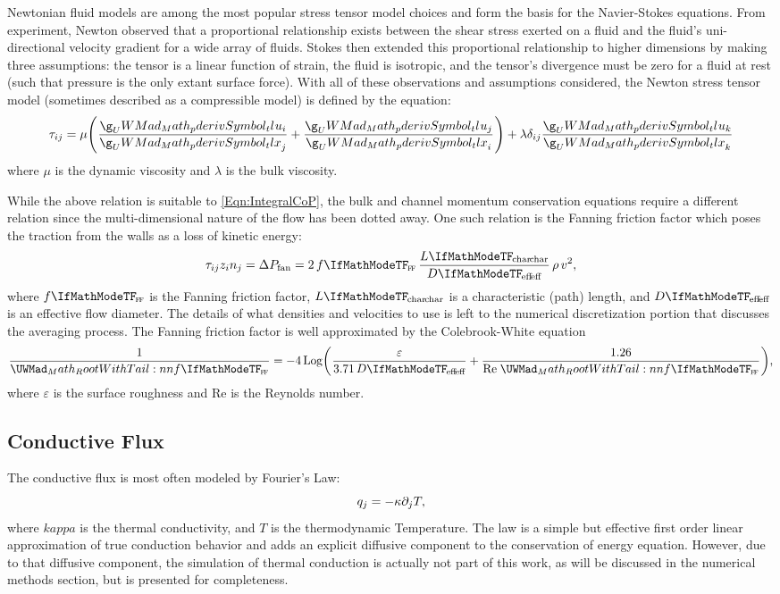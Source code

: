 \documentclass[12pt]{../UWMadThesis}
\begin{document}
Newtonian fluid models are among the most popular stress tensor model choices and form the basis for the Navier-Stokes equations.
From experiment, Newton observed that a proportional relationship exists between the shear stress exerted on a fluid and the fluid's uni-directional velocity gradient for a wide array of fluids.
Stokes then extended this proportional relationship to higher dimensions by making three assumptions: the tensor is a linear function of strain, the fluid is isotropic, and the tensor's divergence must be zero for a fluid at rest (such that pressure is the only extant surface force).
With all of these observations and assumptions considered, the Newton stress tensor model (sometimes described as a compressible model) is defined by the equation:
\begin{equation}
    \tau_{ij} = \mu \left(\pderiv{u_i}{x_j} + \pderiv{u_j}{x_i}\right) + \lambda \delta_{ij} \pderiv{u_k}{x_k}
\end{equation}
where $\mu$ is the dynamic viscosity and $\lambda$ is the bulk viscosity.

While the above relation is suitable to \cref{Eqn:IntegralCoP}, the bulk and channel momentum conservation equations require a different relation since the multi-dimensional nature of the flow has been dotted away.
One such relation is the Fanning friction factor which poses the traction from the walls as a loss of kinetic energy:
\begin{equation}
    \tau_{ij} z_i n_j = \Delta{P}_{\text{fan}} =
        2\,f\subs{\textsc{f}}\,\frac{L\subs{char}}{D\subs{eff}}\,\rho\,v^2,
\end{equation}
where $f\subs{\textsc{f}}$ is the Fanning friction factor, $L\subs{char}$ is a characteristic (path) length, and $D\subs{eff}$ is an effective flow diameter.
The details of what densities and velocities to use is left to the numerical discretization portion that discusses the averaging process.
The Fanning friction factor is well approximated by the Colebrook-White equation
\begin{equation}
    \frac{1}{\Sqrt{f\subs{\textsc{f}}}} = -4 \Log\left(\frac{\varepsilon}{3.71\,D\subs{eff}} + \frac{1.26}{\text{Re}\;\Sqrt{f\subs{\textsc{f}}}}\right),
\end{equation}
where $\varepsilon$ is the surface roughness and $\text{Re}$ is the Reynolds number.


\subsection{Conductive Flux}

The conductive flux is most often modeled by Fourier's Law:
\begin{equation}
    q_j = - \kappa \partial_j{T},
\end{equation}
where $kappa$ is the thermal conductivity, and $T$ is the thermodynamic Temperature.
The law is a simple but effective first order linear approximation of true conduction behavior and adds an explicit diffusive component to the conservation of energy equation.
However, due to that diffusive component, the simulation of thermal conduction is actually not part of this work, as will be discussed in the numerical methods section, but is presented for completeness.
\end{document}
